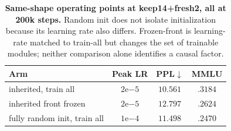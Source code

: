 \begin{table}[t]
\centering
\small
\setlength{\tabcolsep}{4pt}
\begin{tabular}{@{}lccc@{}}
\toprule
\textbf{Arm} & \textbf{Peak LR} & \textbf{PPL}$\downarrow$ & \textbf{MMLU} \\
\midrule
inherited, train all & $2\mathrm{e}{-5}$ & $10.561$ & $.3184$ \\
inherited front frozen & $2\mathrm{e}{-5}$ & $12.797$ & $.2624$ \\
fully random init, train all & $1\mathrm{e}{-4}$ & $11.498$ & $.2470$ \\
\bottomrule
\end{tabular}
\caption{\textbf{Same-shape operating points at keep14+fresh2, all at 200k
steps.} Random init does not isolate initialization because its learning rate
also differs. Frozen-front is learning-rate matched to train-all but changes the
set of trainable modules; neither comparison alone identifies a causal factor.}
\label{tab:control}
\end{table}
